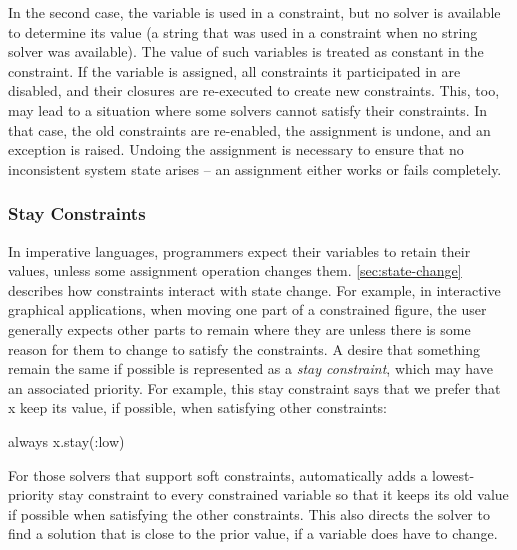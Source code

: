 In the second case, the variable is used in a constraint, but no
solver is available to determine its value (\eg a string that was used
in a constraint when no string solver was available). The value of
such variables is treated as constant in the constraint. If the
variable is assigned, all constraints it participated in are disabled,
and their closures are re-executed to create new constraints. This,
too, may lead to a situation where some solvers cannot satisfy their
constraints. In that case, the old constraints are re-enabled, the
assignment is undone, and an exception is raised. Undoing the
assignment is necessary to ensure that no inconsistent system state
arises -- an assignment either works or fails completely.%

\subsubsection{Stay Constraints}
In imperative languages, programmers expect their variables to retain
their values, unless some assignment operation changes them.
\autoref{sec:state-change} describes how constraints interact with
state change. For example, in interactive graphical applications, when
moving one part of a constrained figure, the user generally expects
other parts to remain where they are unless there is some reason for
them to change to satisfy the constraints.  A desire that something
remain the same if possible is represented as a \emph{stay
  constraint}, which may have an associated priority.  For example,
this stay constraint says that we prefer that x keep its value, if
possible, when satisfying other constraints:
\begin{code}[numbers=none]
always { x.stay(:low) }
\end{code}

For those solvers that support soft constraints, \langname
automatically adds a lowest-priority stay constraint to every
constrained variable so that it keeps its old value if possible when
satisfying the other constraints. This also directs the solver to find
a solution that is close to the prior value, if a variable does have
to change.

